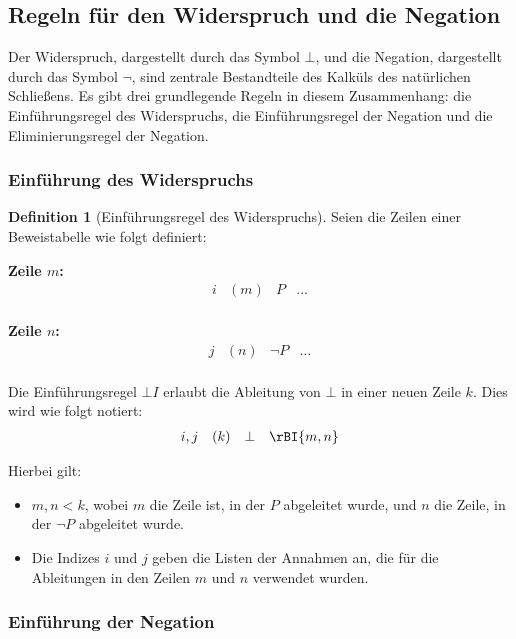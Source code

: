 \documentclass{book}
\theoremstyle{plain}
\theoremstyle{remark}
\theoremstyle{definition}
\newtheorem{definition}{Definition}[section]
\begin{document}
\subsection{Regeln für den Widerspruch und die Negation}

Der Widerspruch, dargestellt durch das Symbol \(\bot\), und die Negation, dargestellt durch das Symbol \(\neg\), sind zentrale Bestandteile des Kalküls des natürlichen Schließens. Es gibt drei grundlegende Regeln in diesem Zusammenhang: die Einführungsregel des Widerspruchs, die Einführungsregel der Negation und die Eliminierungsregel der Negation.

\subsubsection{Einführung des Widerspruchs}
\label{rule:BI}

\begin{definition}[Einführungsregel des Widerspruchs]
Seien die Zeilen einer Beweistabelle wie folgt definiert:

\textbf{Zeile \(m\):}
\[
\begin{array}{llll}
    i & (m) & P & \dots \\
\end{array}
\]

\textbf{Zeile \(n\):}
\[
\begin{array}{llll}
    j & (n) & \neg P & \dots \\
\end{array}
\]

Die Einführungsregel \(\bot I\) erlaubt die Ableitung von \(\bot\) in einer neuen Zeile \(k\). Dies wird wie folgt notiert:
\[
\begin{array}{llll}
    i, j & (k) & \bot & \rBI{m,n} \\
\end{array}
\]

Hierbei gilt:
\begin{itemize}
    \item \(m, n < k\), wobei \(m\) die Zeile ist, in der \(P\) abgeleitet wurde, und \(n\) die Zeile, in der \(\neg P\) abgeleitet wurde.
    \item Die Indizes \(i\) und \(j\) geben die Listen der Annahmen an, die für die Ableitungen in den Zeilen \(m\) und \(n\) verwendet wurden.
\end{itemize}
\end{definition}

\subsubsection{Einführung der Negation}
\label{rule:CI}
\end{document}
